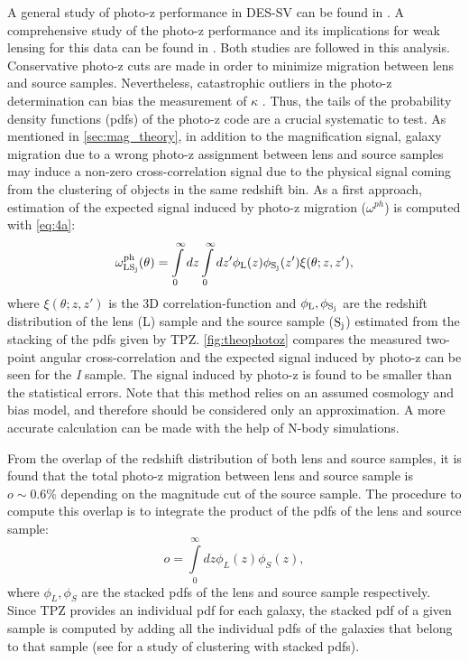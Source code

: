 A general study of photo-z performance in DES-SV can be found in \cite{2014MNRAS.445.1482S}. A comprehensive study of the photo-z performance and its implications for weak lensing for this data can be found in \cite{PhysRevD.94.042005}. Both studies are followed in this analysis.
\newline
	Conservative photo-z cuts are made in order to minimize migration between lens and source samples. Nevertheless, catastrophic outliers in the photo-z determination can bias the measurement of  $\kappa$ \cite{2010MNRAS.401.1399B}. Thus, the tails of the probability density functions (pdfs) of the photo-z code are a crucial systematic to test.
	\newline
	As mentioned in \autoref{sec:mag_theory}, in addition to the magnification signal, galaxy migration due to a wrong photo-z assignment between lens and source samples may induce a non-zero cross-correlation signal due to the physical signal coming from the clustering of objects in the same redshift bin. As a first approach, estimation of the expected signal induced by photo-z migration ($\omega^{ph}$) is computed with \autoref{eq:4a}:
\begin{equation}
\omega_{\rm LS_j}^{\rm ph}(\theta) = \int\limits_0^\infty dz\int\limits_0^\infty dz' \phi_{\rm L}(z)\phi_{\rm S_j}(z')\xi(\theta;z,z'),
\label{eq:phth}
\end{equation}
where $\xi(\theta;z,z')$ is the 3D correlation-function and $\phi_{\rm L},\phi_{\rm S_j}$ are the redshift distribution of the lens (L) sample and the source sample ($\rm S_j$) estimated from the stacking of the pdfs given by TPZ. \autoref{fig:theophotoz} compares the measured two-point angular cross-correlation and the expected signal induced by photo-z can be seen for the \textit{I} sample. The signal induced by photo-z is found to be smaller than the statistical errors. Note that this method relies on an assumed cosmology and bias model, and therefore should be considered only an approximation. A more accurate calculation can be made with the help of N-body simulations.
\newline

From the overlap of the redshift distribution of both lens and source samples, it is found that the total photo-z migration between lens and source sample is $o\sim 0.6\%$ depending on the magnitude cut of the source sample. The procedure to compute this overlap is to integrate the product of the pdfs of the lens and source sample:
\begin{equation}
o = \int\limits_0^\infty dz\phi_L(z)\phi_S(z),
\end{equation}
where $\phi_L,\phi_S$ are the stacked pdfs of the lens and source sample respectively. Since TPZ provides an individual pdf for each galaxy, the stacked pdf of a given sample is computed by adding all the individual pdfs of the galaxies that belong to that sample (see \cite{2016MNRAS.459.1293A} for a study of clustering with stacked pdfs).
\newline

